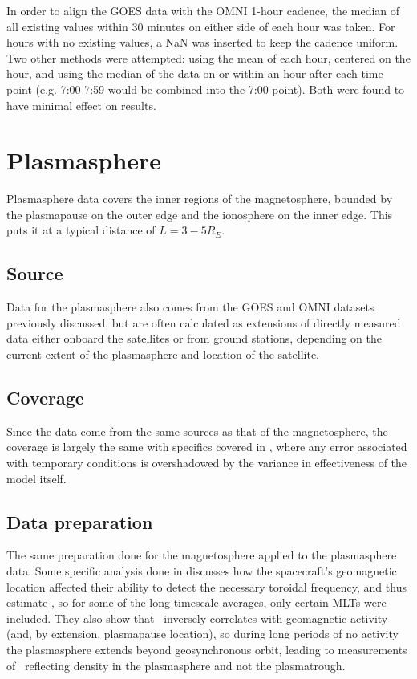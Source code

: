 In order to align the GOES data with the OMNI 1-hour cadence, the median of all existing values within 30 minutes on either side of each hour was taken. For hours with no existing values, a NaN was inserted to keep the cadence uniform. Two other methods were attempted: using the mean of each hour, centered on the hour, and using the median of the data on or within an hour after each time point (e.g. 7:00-7:59 would be combined into the 7:00 point). Both were found to have minimal effect on results.

\section{Plasmasphere}
Plasmasphere data covers the inner regions of the magnetosphere, bounded by the plasmapause on the outer edge and the ionosphere on the inner edge. This puts it at a typical distance of $L=3-5R_E$. 

\subsection{Source}
Data for the plasmasphere also comes from the GOES and OMNI datasets previously discussed, but are often calculated as extensions of directly measured data either onboard the satellites or from ground stations, depending on the current extent of the plasmasphere and location of the satellite.

\subsection{Coverage}
Since the data come from the same sources as that of the magnetosphere, the coverage is largely the same with specifics covered in \cite{Takahashi2010SolarCycleVariation}, where any error associated with temporary conditions is overshadowed by the variance in effectiveness of the model itself. 

\subsection{Data preparation}
The same preparation done for the magnetosphere applied to the plasmasphere data.  Some specific analysis done in \cite{Takahashi2010SolarCycleVariation} discusses how the spacecraft's geomagnetic location affected their ability to detect the necessary toroidal frequency, and thus estimate \req, so for some of the long-timescale averages, only certain MLTs were included. They also show that \req\ inversely correlates with geomagnetic activity (and, by extension, plasmapause location), so during long periods of no activity the plasmasphere extends beyond geosynchronous orbit, leading to measurements of \req\ reflecting density in the plasmasphere and not the plasmatrough. 
